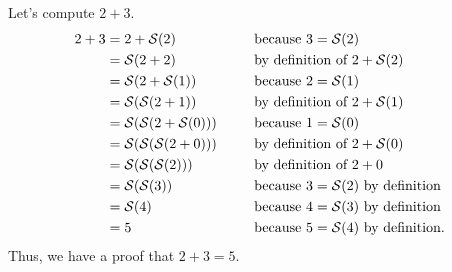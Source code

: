\newpage
\begin{example}
    Let's compute \(2 + 3\).
    \begin{alignat*}{2}
        2 + 3 &= 2 + \successor{2} &&\text{ because } 3 = \successor{2}\\
              &= \successor{2 + 2} &&\text{ by definition of } 2 + \successor{2}\\
              &= \successor{2 + \successor{1}} &&\text{ because } 2 = \successor{1}\\
              &= \successor{\successor{2 + 1}} &&\text{ by definition of } 2 + \successor{1}\\
              &= \successor{\successor{2 + \successor{0}}} &&\text{ because } 1 = \successor{0}\\
              &= \successor{\successor{\successor{2 + 0}}}~~~~&&\text{ by definition of } 2 + \successor{0}\\
              &= \successor{\successor{\successor{2}}} &&\text{ by definition of } 2 + 0\\
              &= \successor{\successor{3}} &&\text{ because } 3 = \successor{2} \text{ by definition}\\
              &= \successor{4} &&\text{ because } 4 = \successor{3} \text{ by definition}\\
              &= 5 &&\text{ because } 5 = \successor{4} \text{ by definition}.
    \end{alignat*}
    Thus, we have a proof that \(2 + 3 = 5\).
\end{example}
